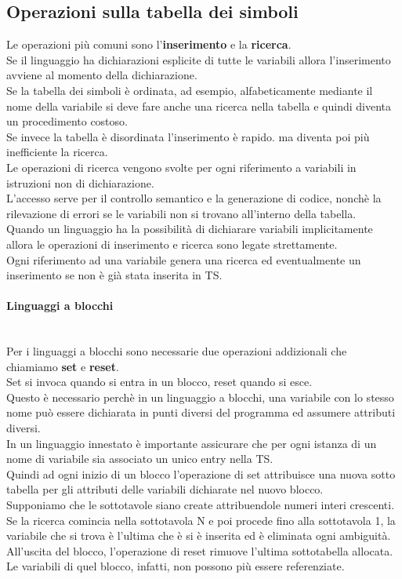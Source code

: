 \documentclass[12pt]{report}
\begin{document}
	\subsection{Operazioni sulla tabella dei simboli}
	Le operazioni più comuni sono l'\textbf{inserimento} e la \textbf{ricerca}. \\
	Se il linguaggio ha dichiarazioni esplicite di tutte le variabili allora l'inserimento avviene al momento della dichiarazione. \\
	Se la tabella dei simboli è ordinata, ad esempio, alfabeticamente mediante il nome della variabile si deve fare anche una ricerca nella tabella e quindi diventa un procedimento costoso. \\
	Se invece la tabella è disordinata l'inserimento è rapido. ma diventa poi più inefficiente la ricerca. \\
	Le operazioni di ricerca vengono svolte per ogni riferimento a variabili in istruzioni non di dichiarazione. \\
	L'accesso serve per il controllo semantico e la generazione di codice, nonchè la rilevazione di errori se le variabili non si trovano all'interno della tabella. \\
	Quando un linguaggio ha la possibilità di dichiarare variabili implicitamente allora le operazioni di inserimento e ricerca sono legate strettamente. \\
	Ogni riferimento ad una variabile genera una ricerca ed eventualmente un inserimento se non è già stata inserita in TS. \\
	\paragraph{Linguaggi a blocchi} \quad \\
	Per i linguaggi a blocchi sono necessarie due operazioni addizionali che chiamiamo \textbf{set} e \textbf{reset}. \\
	Set si invoca quando si entra in un blocco, reset quando si esce. \\
	Questo è necessario perchè in un linguaggio a blocchi, una variabile con lo stesso nome può essere dichiarata in punti diversi del programma ed assumere attributi diversi. \\
	In un linguaggio innestato è importante assicurare che per ogni istanza di un nome di variabile sia associato un unico entry nella TS. \\
	Quindi ad ogni inizio di un blocco l'operazione di set attribuisce una nuova sotto tabella per gli attributi delle variabili dichiarate nel nuovo blocco. \\
	Supponiamo che le sottotavole siano create attribuendole numeri interi crescenti. \\
	Se la ricerca comincia nella sottotavola N e poi procede fino alla sottotavola 1, la variabile che si trova è l'ultima che è si è inserita ed è eliminata ogni ambiguità. \\
	All'uscita del blocco, l'operazione di reset rimuove l'ultima sottotabella allocata. Le variabili di quel blocco, infatti, non possono più essere referenziate.
\end{document}
